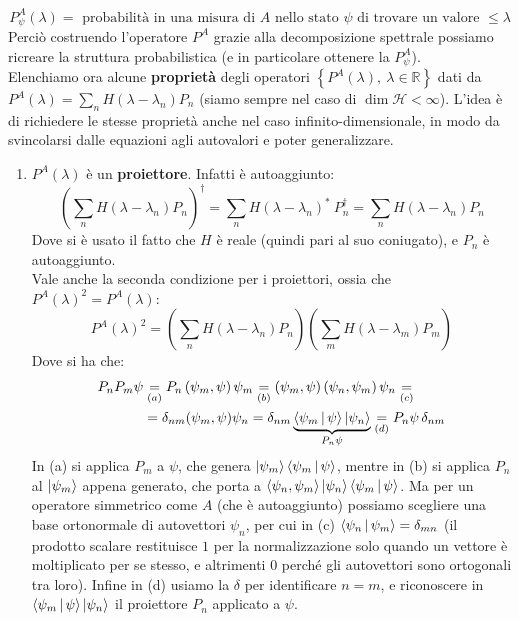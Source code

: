 \documentclass[../../FisicaTeorica.tex]{subfiles}
\begin{document}
\[
P_\psi^A\left(\lambda\right)=\text{ probabilità in una misura di $A$ nello stato $\psi$  di trovare un valore }\leq \lambda 
\]
Perciò costruendo l'operatore $P^A$ grazie alla decomposizione spettrale possiamo ricreare la struttura probabilistica (e in particolare ottenere la  $P^A_\psi$).\\
Elenchiamo ora alcune \textbf{proprietà} degli operatori $\left\{P^A\left(\lambda\right),\ \lambda\in\mathbb{R}\right\}$ dati da $P^A(\lambda) = \sum_n H(\lambda-\lambda_n)P_n$
(siamo sempre nel caso di $\dim{\mathcal{H}}<\infty$). L'idea è di richiedere le stesse proprietà anche nel caso infinito-dimensionale, in modo da svincolarsi dalle equazioni agli autovalori e poter generalizzare.
\begin{enumerate}
    \item $P^A(\lambda)$ è un \textbf{proiettore}. Infatti è autoaggiunto:
    \[
	\left(\sum_{n}{H\left(\lambda-\lambda_n\right)P_n}\right)^\dag=\sum_{n}{H\left(\lambda-\lambda_n\right)^\ast\ P_n^\dag}=\sum_{n}{H\left(\lambda-\lambda_n\right)P_n}
	\]
	Dove si è usato il fatto che $H$ è reale (quindi pari al suo coniugato), e $P_n$ è autoaggiunto.\\
	Vale anche la seconda condizione per i proiettori, ossia che $P^A(\lambda)^2 = P^A(\lambda)$:
	\begin{equation}
	P^A\left(\lambda\right)^2
	=\left(\sum_{n}{H\left(\lambda-\lambda_n\right)P_n}\right)\left(\sum_{m}{H\left(\lambda-\lambda_m\right)P_m}\right)
	\label{eqn:PAquadro}
	\end{equation}
	Dove si ha che:
	\begin{align*}
	P_nP_m\psi&\underset{(a)}{=}P_n\left(\psi_m,\psi\right)\psi_m \underset{(b)}{=}\left(\psi_m,\psi\right)\left(\psi_n,\psi_m\right)\psi_n \underset{(c)}{=}\\
	&= \delta_{nm}(\psi_m, \psi) \psi_n = 
	\delta_{nm}\underbrace{\Braket{\psi_m | \psi}\Ket{\psi_n}}_{P_n\psi}  \underset{(d)}{=} 
	P_n\psi\,\delta_{nm}
	\end{align*}
	In (a) si applica $P_m$ a $\psi$, che genera $\Ket{\psi_m}\Braket{\psi_m|\psi}$, mentre in (b) si applica $P_n$ al $\Ket{\psi_m}$ appena generato, che porta a $\Braket{\psi_n, \psi_m}\Ket{\psi_n} \Braket{\psi_m|\psi}$. Ma per un operatore simmetrico come $A$ (che è autoaggiunto) possiamo scegliere una base ortonormale di autovettori $\psi_n$, per cui in (c) $\Braket{\psi_n|\psi_m} = \delta_{mn}$ (il prodotto scalare restituisce $1$ per la normalizzazione solo quando un vettore è moltiplicato per se stesso, e altrimenti $0$ perché gli autovettori sono ortogonali tra loro). Infine in (d) usiamo la $\delta$ per identificare $n=m$, e riconoscere in $\Braket{\psi_m | \psi}\Ket{\psi_n}$ il proiettore $P_n$ applicato a $\psi$.\\

\end{enumerate}
\end{document}
